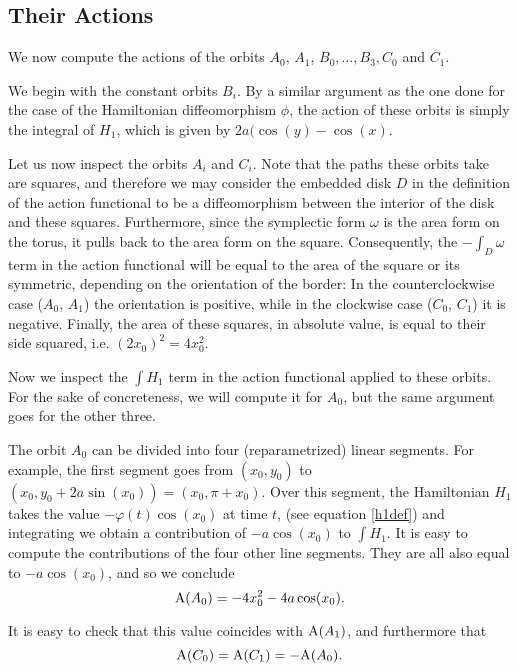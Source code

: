\subsection{Their Actions}

We now compute the actions of the orbits $A_0$, $A_1$, $B_0, \dots, B_3, C_0$ and $C_1$.

We begin with the constant orbits $B_i$. By a similar argument as the one done for the case of the Hamiltonian diffeomorphism $\phi$, the action of these orbits is simply the integral of $H_1$, which is given by $2a(\cos(y) - \cos(x)$.

Let us now inspect the orbits $A_i$ and $C_i$. Note that the paths these orbits take are squares, and therefore we may consider the embedded disk $D$ in the definition of the action functional to be a diffeomorphism between the interior of the disk and these squares. Furthermore, since the symplectic form $\omega$ is the area form on the torus, it pulls back to the area form on the square. Consequently, the $- \int_D \omega$ term in the action functional will be equal to the area of the square or its symmetric, depending on the orientation of the border: In the counterclockwise case ($A_0$, $A_1$) the orientation is positive, while in the clockwise case ($C_0$, $C_1$) it is negative. Finally, the area of these squares, in absolute value, is equal to their side squared, i.e. $(2x_0)^2 = 4x_0^2$.

Now we inspect the $\int H_1$ term in the action functional applied to these orbits. For the sake of concreteness, we will compute it for $A_0$, but the same argument goes for the other three.

The orbit $A_0$ can be divided into four (reparametrized) linear segments. For example, the first segment goes from $(x_0, y_0)$ to $(x_0, y_0 + 2a \sin(x_0)) = (x_0, \pi + x_0)$. Over this segment, the Hamiltonian $H_1$ takes the value $- \varphi(t) \cos(x_0)$ at time $t$, (see equation \eqref{h1def}) and integrating we obtain a contribution of $- a \cos(x_0)$ to $\int H_1$. It is easy to compute the contributions of the four other line segments. They are all also equal to $- a \cos(x_0)$, and so we conclude
\begin{equation}
\AA(A_0) = - 4 x_0^2 - 4 a \cos(x_0).
\end{equation}

It is easy to check that this value coincides with $\AA(A_1)$, and furthermore that
\begin{equation}
\AA(C_0) = \AA(C_1) = - \AA(A_0).
\end{equation}

